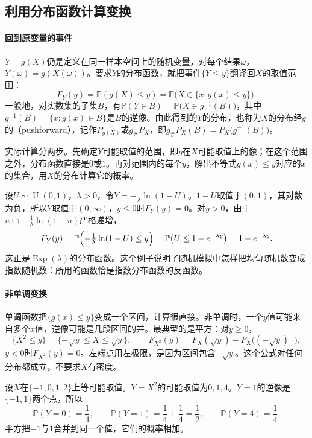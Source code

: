 \subsection{利用分布函数计算变换}
\label{sec:prob-cdf-method}

\paragraph{回到原变量的事件}
$Y=g(X)$仍是定义在同一样本空间上的随机变量，对每个结果$\omega$，$Y(\omega)=g(X(\omega))$。要求$Y$的分布函数，就把事件$\{Y\leq y\}$翻译回$X$的取值范围：
\[
  F_Y(y)=\mathbb{P}(g(X)\leq y)=\mathbb{P}\bigl(X\in\{x:g(x)\leq y\}\bigr).
\]
一般地，对实数集的子集$B$，有$\mathbb{P}(Y\in B)=\mathbb{P}\bigl(X\in g^{-1}(B)\bigr)$，其中$g^{-1}(B)=\{x:g(x)\in B\}$是$B$的逆像。由此得到的$Y$的分布，也称为$X$的分布经$g$的（pushforward），记作$P_{g(X)}$或$g_{\#}P_X$，即$g_{\#}P_X(B)=P_X\bigl(g^{-1}(B)\bigr)$。

实际计算分两步。先确定$Y$可能取值的范围，即$g$在$X$可能取值上的像；在这个范围之外，分布函数直接是$0$或$1$。再对范围内的每个$y$，解出不等式$g(x)\leq y$对应的$x$的集合，用$X$的分布计算它的概率。

\begin{example}[由均匀变量得到指数变量]
\label{ex:prob-uniform-to-exponential}
设$U\sim\operatorname{U}(0,1)$，$\lambda>0$，令$Y=-\frac1\lambda\ln(1-U)$。$1-U$取值于$(0,1)$，其对数为负，所以$Y$取值于$(0,\infty)$，$y\leq0$时$F_Y(y)=0$。对$y>0$，由于$u\mapsto-\frac1\lambda\ln(1-u)$严格递增，
\[
  F_Y(y)=\mathbb{P}\Bigl(-\tfrac1\lambda\ln(1-U)\leq y\Bigr)=\mathbb{P}\bigl(U\leq1-e^{-\lambda y}\bigr)=1-e^{-\lambda y}.
\]
这正是$\operatorname{Exp}(\lambda)$的分布函数。这个例子说明了随机模拟中怎样把均匀随机数变成指数随机数：所用的函数恰是指数分布函数的反函数。
\end{example}

\paragraph{非单调变换}
单调函数把$\{g(x)\leq y\}$变成一个区间，计算很直接。非单调时，一个$y$值可能来自多个$x$值，逆像可能是几段区间的并。最典型的是平方：对$y\geq0$，
\[
  \{X^2\leq y\}=\{-\sqrt y\leq X\leq\sqrt y\},\qquad
  F_{X^2}(y)=F_X(\sqrt y)-F_X\bigl((-\sqrt y)^-\bigr),
\]
$y<0$时$F_{X^2}(y)=0$。左端点用左极限，是因为区间包含$-\sqrt y$。这个公式对任何分布都成立，不要求$X$有密度。

\begin{example}[离散变量的平方]
\label{ex:prob-discrete-square}
设$X$在$\{-1,0,1,2\}$上等可能取值。$Y=X^2$的可能取值为$0,1,4$。$Y=1$的逆像是$\{-1,1\}$两个点，所以
\[
  \mathbb{P}(Y=0)=\frac14,\qquad\mathbb{P}(Y=1)=\frac14+\frac14=\frac12,\qquad\mathbb{P}(Y=4)=\frac14 .
\]
平方把$-1$与$1$合并到同一个值，它们的概率相加。
\end{example}

